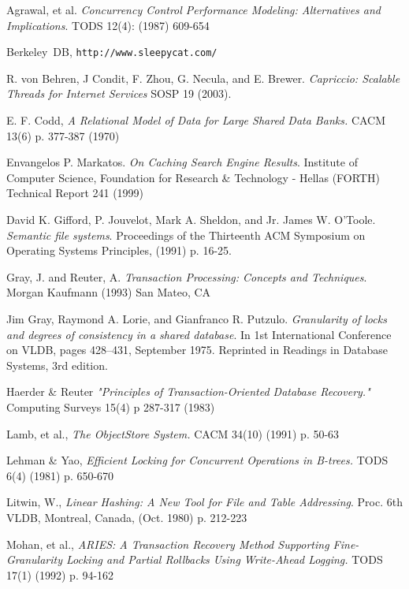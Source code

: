 \documentclass[10pt,letterpaper,twocolumn,english]{article}
\begin{document}
\begin{thebibliography}{99}

 Agrawal, et al. {\em Concurrency Control Performance Modeling: Alternatives and Implications}. TODS 12(4): (1987) 609-654

 Berkeley~DB, {\tt http://www.sleepycat.com/}

 R. von Behren, J Condit, F. Zhou, G. Necula, and E. Brewer. {\em Capriccio: Scalable Threads for Internet Services} SOSP 19 (2003).

 E. F. Codd, {\em A Relational Model of Data for Large Shared Data Banks.} CACM 13(6) p. 377-387 (1970)

 Envangelos P. Markatos. {\em On Caching Search Engine Results}.  Institute of Computer Science, Foundation for Research \& Technology - Hellas (FORTH) Technical Report 241 (1999)

 David K. Gifford, P. Jouvelot, Mark A. Sheldon, and Jr. James W. O'Toole. {\em Semantic file systems}. Proceedings of the Thirteenth ACM Symposium on Operating Systems Principles, (1991) p. 16-25.

 Gray, J. and Reuter, A. {\em Transaction Processing: Concepts and Techniques}. Morgan Kaufmann (1993) San Mateo, CA

 Jim Gray, Raymond A. Lorie, and Gianfranco R. Putzulo. {\em Granularity of locks and degrees of consistency in a shared database}. In 1st International Conference on VLDB, pages 428--431, September 1975. Reprinted in Readings in Database Systems, 3rd edition.

 Haerder \& Reuter {\em "Principles of Transaction-Oriented Database Recovery." } Computing Surveys 15(4) p 287-317 (1983)

 Lamb, et al., {\em The ObjectStore System.} CACM 34(10) (1991) p. 50-63

 Lehman \& Yao, {\em Efficient Locking for Concurrent Operations in B-trees.} TODS 6(4) (1981) p. 650-670

 Litwin, W., {\em Linear Hashing: A New Tool for File and Table Addressing}. Proc. 6th VLDB, Montreal, Canada, (Oct. 1980) p. 212-223

 Mohan, et al., {\em ARIES: A Transaction Recovery Method Supporting Fine-Granularity Locking and Partial Rollbacks Using Write-Ahead Logging.} TODS 17(1) (1992) p. 94-162


\end{thebibliography}
\end{document}
